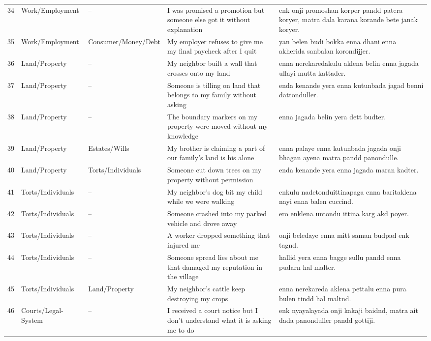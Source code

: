 \documentclass[11pt]{article}
\begin{document}
\begin{longtable}{p{} p{} p{} p{} p{}}
34 & Work/\allowbreak Employment & -- & I was promised a promotion but someone else got it without explanation & enk onji promoshan korper pandd patera koryer, matra dala karana korande bete janak koryer. \\
35 & Work/\allowbreak Employment & Consumer/\allowbreak Money/\allowbreak Debt & My employer refuses to give me my final paycheck after I quit & yan belen budi bokka enna dhani enna akherida sanbalan korondijjer. \\
36 & Land/\allowbreak Property & -- & My neighbor built a wall that crosses onto my land & enna nerekaredakulu aklena belin enna jagada ullayi mutta kattader. \\
37 & Land/\allowbreak Property & -- & Someone is tilling on land that belongs to my family without asking & enda kenande yera enna kutunbada jagad benni dattonduller. \\
38 & Land/\allowbreak Property & -- & The boundary markers on my property were moved without my knowledge & enna jagada belin yera dett budter. \\
39 & Land/\allowbreak Property & Estates/\allowbreak Wills & My brother is claiming a part of our family's land is his alone & enna palaye enna kutunbada jagada onji bhagan ayena matra pandd panondulle. \\
40 & Land/\allowbreak Property & Torts/\allowbreak Individuals & Someone cut down trees on my property without permission & enda kenande yera enna jagada maran kadter. \\
41 & Torts/\allowbreak Individuals & -- & My neighbor's dog bit my child while we were walking & enkulu nadetonduittinapaga enna baritaklena nayi enna balen cuccind. \\
42 & Torts/\allowbreak Individuals & -- & Someone crashed into my parked vehicle and drove away & ero enklena untondu ittina karg akd poyer. \\
43 & Torts/\allowbreak Individuals & -- & A worker dropped something that injured me & onji beledaye enna mitt saman budpad enk tagnd. \\
44 & Torts/\allowbreak Individuals & -- & Someone spread lies about me that damaged my reputation in the village & hallid yera enna bagge sullu pandd enna pudarn hal malter. \\
45 & Torts/\allowbreak Individuals & Land/\allowbreak Property & My neighbor's cattle keep destroying my crops & enna nerekareda aklena pettalu enna pura bulen tindd hal maltnd. \\
46 & Courts/\allowbreak Legal-System & -- & I received a court notice but I don't understand what it is asking me to do & enk nyayalayada onji kakaji baidnd, matra ait dada panonduller pandd gottiji. \\

\end{longtable}
\end{document}
